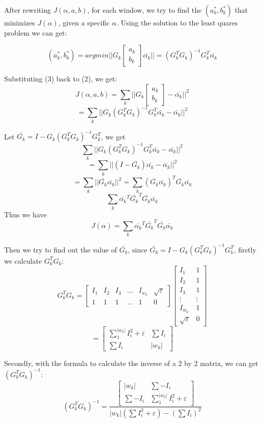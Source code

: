 \documentclass[11pt,letterpaper]{article}
\begin{document}
After rewriting $J(\alpha, a, b)$, for each window, we try to find the $(a_k^*, b_k^*)$ that minimizes $J(\alpha)$, given a specific $\alpha$. Using the solution to the least quares problem we can get:

\begin{equation}
(a_k^*, b_k^*) = argmin||G_k \begin{bmatrix} a_k \\ b_k\end{bmatrix} \bar{\alpha_k}|| = (G_k^TG_k)^{-1}G_k^T \bar{\alpha_k}
\end{equation}

Substituting (3) back to (2), we get:
$$J(\alpha, a, b) = \sum_{k}||G_k \begin{bmatrix} a_k \\ b_k\end{bmatrix} - \bar{\alpha_k}||^2 $$
$$= \sum_{k}||G_k(G_k^TG_k)^{-1}G_k^T \bar{\alpha_k} - \bar{\alpha_k}||^2$$

Let $\bar{G_k} = I - G_k(G_k^T G_k)^{-1}G_k^T$, we get
$$\sum_{k}||G_k(G_k^TG_k)^{-1}G_k^T \bar{\alpha_k} - \bar{\alpha_k}||^2$$
$$ = \sum_{k}|| (I - \bar{G_k})\bar{\alpha_k} - \bar{\alpha_k}||^2 $$
$$ = \sum_{k}|| \bar{G_k}\bar{\alpha_k}||^2 = \sum_{k} (\bar{G_k}\bar{\alpha_k})^T \bar{G_k}\bar{\alpha_k} $$
$$ \sum_{k} \bar{\alpha_k}^T\bar{G_k}^T \bar{G_k}\bar{\alpha_k}$$
Thus we have
$$J(\alpha) = \sum_{k} \bar{\alpha_k}^T\bar{G_k}^T \bar{G_k}\bar{\alpha_k}$$

Then we try to find out the value of $\bar{G_k}$, since $\bar{G_k} = I - G_k(G_k^T G_k)^{-1}G_k^T$, firstly we calculate $G_k^TG_k$: 
$$G_k^TG_k = \begin{bmatrix}
    I_1 & I_2 & I_3 & ... & I_{w_k} & \sqrt{\varepsilon}\\
    1 & 1 & 1 & ... & 1 & 0 
  \end{bmatrix}
  \begin{bmatrix}
    I_1 & 1 \\ I_2 & 1 \\ I_3 & 1 \\ \vdots & \vdots \\ I_{w_k} & 1 \\ \sqrt{\varepsilon} & 0 
  \end{bmatrix} $$
$$ = \begin{bmatrix}
    \sum_{1}^{|w_k|} I_i^2 + \varepsilon & \sum I_i \\
    \sum I_i & |w_k|
  \end{bmatrix}$$

Secondly, with the formula to calculate the inverse of a 2 by 2 matrix, we can get $(G_k^TG_k)^{-1}$: 
$$(G_k^TG_k)^{-1} = \frac{\begin{bmatrix}
    |w_k| & \sum -I_i \\
    \sum -I_i & \sum_{1}^{|w_k|} I_i^2 + \varepsilon
  \end{bmatrix}}{|w_k|(\sum I_i^2 + \varepsilon) - (\sum I_i)^2} 
  $$
\end{document}
